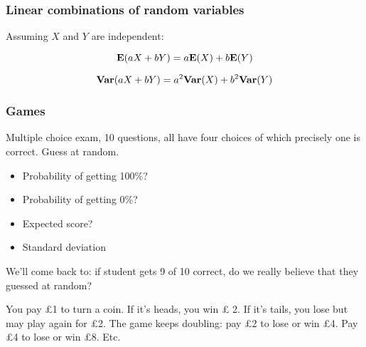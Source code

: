 \documentclass[t]{beamer}
\begin{document}
\begin{frame}
  \frametitle{Linear combinations of random variables}

  Assuming $X$ and $Y$ are independent:
  
  \begin{displaymath}
    \mathbf{E}(aX+bY) = a\mathbf{E}(X) + b\mathbf{E}(Y)
  \end{displaymath}

  \begin{displaymath}
    \mathbf{Var}(aX+bY) = a^2\mathbf{Var}(X) + b^2\mathbf{Var}(Y)
  \end{displaymath}
\end{frame}

\begin{frame}
  \frametitle{Games}

   {
    Multiple choice exam, 10 questions, all have four choices of which
    precisely one is correct.  Guess at random.
    \begin{itemize}
    \item Probability of getting 100\%? 
    \item Probability of getting 0\%? 
    \item Expected score? 
    \item Standard deviation 
    \end{itemize}
    We'll come back to: if student gets 9 of 10 correct, do we really
    believe that they guessed at random?
  }

   {
    You pay \pounds 1 to turn a coin.  If it's heads, you win \pounds
    2.  If it's tails, you lose but may play again for \pounds 2.  The
    game keeps doubling: pay \pounds 2 to lose or win \pounds 4.  Pay
    \pounds 4 to lose or win \pounds 8.  Etc.
  }

\end{frame}
\end{document}

